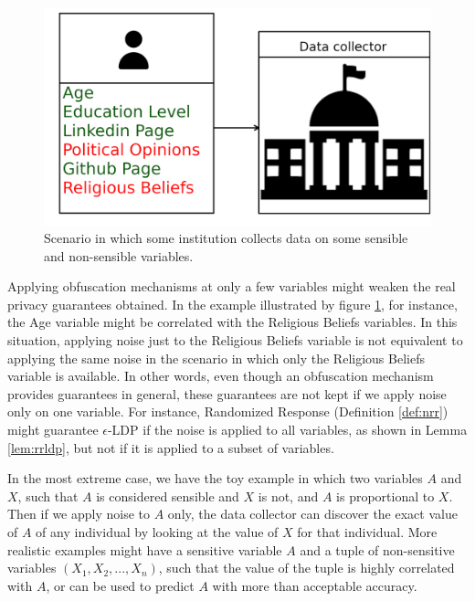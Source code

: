 \documentclass[conference]{IEEEtran}
\begin{document}
\begin{figure}[ht]
\centering
\includegraphics[width=\columnwidth]{sensitiveVars}
\caption{Scenario in which some institution collects data on some sensible and non-sensible variables.}\label{fig:sensitiveVars}
\end{figure}

Applying obfuscation mechanisms at only a few variables might weaken the real privacy guarantees obtained. In the example illustrated by figure \ref{fig:sensitiveVars}, for instance, the Age variable might be correlated with the Religious Beliefs variables. In this situation, applying noise just to the Religious Beliefs variable is not equivalent to applying the same noise in the scenario in which only the Religious Beliefs variable is available. In other words, even though an obfuscation mechanism provides guarantees in general, these guarantees are not kept if we apply noise only on one variable. For instance, Randomized Response (Definition \ref{def:nrr}) might guarantee $\epsilon$-LDP if the noise is applied to all variables, as shown in Lemma \ref{lem:rrldp}, but not if it is applied to a subset of variables.

In the most extreme case, we have the toy example in which two variables $A$ and $X$, such that $A$ is considered sensible and $X$ is not, and $A$ is proportional to $X$. Then if we apply noise to $A$ only, the data collector can discover the exact value of $A$ of any individual by looking at the value of $X$ for that individual. More realistic examples might have a sensitive variable $A$ and a tuple of non-sensitive variables $(X_1,X_2,...,X_n)$, such that the value of the tuple is highly correlated with $A$, or can be used to predict $A$ with more than acceptable accuracy.
\end{document}

